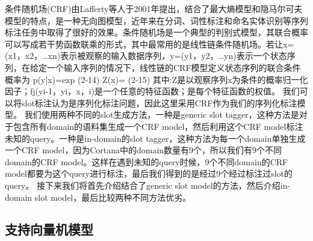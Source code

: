 \documentclass[master]{njuthesis}
\begin{document}
条件随机场(CRF)由Lafferty等人于2001年提出，结合了最大熵模型和隐马尔可夫模型的特点，是一种无向图模型，近年来在分词、词性标注和命名实体识别等序列标注任务中取得了很好的效果。条件随机场是一个典型的判别式模型，其联合概率可以写成若干势函数联乘的形式，其中最常用的是线性链条件随机场。若让x=(x1，x2，…xn)表示被观察的输入数据序列，y=(y1，y2，…yn)表示一个状态序列，在给定一个输入序列的情况下，线性链的CRF模型定义状态序列的联合条件概率为
p(y|x)=exp{} (2-14)
Z(x)={} (2-15)
其中:Z是以观察序列x为条件的概率归一化因子；fj(yi-1，yi，x，i)是一个任意的特征函数；是每个特征函数的权值。
我们可以将slot标注认为是序列化标注问题，因此这里采用CRF作为我们的序列化标注模型。
我们使用两种不同的slot生成方法，一种是generic slot tagger，这种方法是对于包含所有domain的语料集生成一个CRF model，然后利用这个CRF model标注未知的query。一种是in-domain的slot tagger，这种方法为每一个domain单独生成一个CRF model，因为Cortana中的domain数量有9个，所以我们有9个不同domain的CRF model。这样在遇到未知的query时候，9个不同domain的CRF model都要为这个query进行标注，最后我们得到的是经过9个经过标注过slot的query。
接下来我们将首先介绍结合了generic slot model的方法，然后介绍in-domain slot model，最后比较两种不同方法优劣。

\subsection{支持向量机模型}
\end{document}
